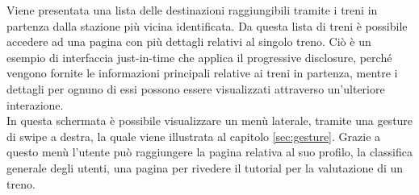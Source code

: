 Viene presentata una lista delle destinazioni raggiungibili tramite i treni in partenza dalla stazione più vicina identificata. Da questa lista di treni è possibile accedere ad una pagina con più dettagli relativi al singolo treno.
Ciò è un esempio di interfaccia just-in-time che applica il progressive disclosure, perché vengono fornite le informazioni principali relative ai treni in partenza, mentre i dettagli per ognuno di essi possono essere visualizzati attraverso un'ulteriore interazione.\\
In questa schermata è possibile visualizzare un menù laterale, tramite una gesture di swipe a destra, la quale viene illustrata al capitolo \ref{sec:gesture}. Grazie a questo menù l'utente può raggiungere la pagina relativa al suo profilo, la classifica generale degli utenti, una pagina per rivedere il tutorial per la valutazione di un treno.
